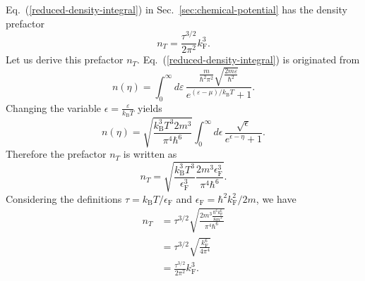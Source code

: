 \documentclass[aps,showkeys,noshowpacs,superscriptaddress,pre,preprint]{revtex4-2}
\begin{document}
Eq.~(\ref{reduced-density-integral}) in Sec.~\ref{sec:chemical-potential} has the density prefactor
\begin{equation}
n_T = \frac{\tau^{3/2}}{2\pi^2} k_\mathrm{F}^3 .
\end{equation}
Let us derive this prefactor $n_T$.
Eq.~(\ref{reduced-density-integral}) is originated from
\begin{equation*}
n\left( \eta \right) = 
\int_0^\infty d\varepsilon \, \frac{\frac{m}{\hbar^2 \pi^2} \sqrt{\frac{2m \varepsilon}{\hbar^2}}}{
e^{\left( \varepsilon - \mu \right) / k_\mathrm{B} T } + 1 }  .
\end{equation*}
Changing the variable $\epsilon = \frac{\varepsilon}{k_\mathrm{B}T}$ yields
\begin{equation*}
n\left( \eta \right) = 
\sqrt{\frac{k_\mathrm{B}^3 T^3 2 m^3}{\pi^4 \hbar^6}}
\int_0^\infty d\epsilon \,
\frac{\sqrt{\epsilon}}{e^{\epsilon - \eta} + 1} .
\end{equation*}
Therefore the prefactor $n_T$ is written as
\begin{equation*}
n_T = \sqrt{\frac{k_\mathrm{B}^3 T^3}{\epsilon_\mathrm{F}^3} \frac{2 m^3 \epsilon_\mathrm{F}^3}{\pi^4 \hbar^6} } .
\end{equation*}
Considering the definitions $\tau = k_\mathrm{B} T / \epsilon_\mathrm{F}$
and $\epsilon_\mathrm{F} = \hbar^2 k_\mathrm{F}^2 / 2m$,
we have
\begin{equation}
\begin{aligned}
n_T &= \tau^{3/2} \sqrt{\frac{ 2 m^3 \frac{\hbar^6 k_\mathrm{F}^6}{8 m^3}}{\pi^4 \hbar^6}} \\
&= \tau^{3/2} \sqrt{\frac{k_\mathrm{F}^6}{4\pi^4}} \\
&= \frac{\tau^{3/2}}{2 \pi^2} k_\mathrm{F}^3 .
\end{aligned}
\end{equation}
\end{document}
